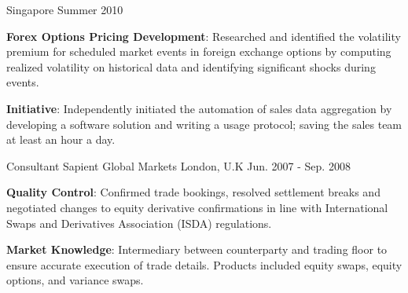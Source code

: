 \begin{cventries}
    {Singapore}
    {Summer 2010}
    {
      \begin{cvitems}
        \item {\textbf{Forex Options Pricing Development}: Researched and identified the volatility premium for scheduled  
        market events in foreign exchange options by computing realized volatility on historical data and   
        identifying significant shocks during events}.
        \item {\textbf{Initiative}: Independently initiated the automation of sales data aggregation by developing a software solution and writing a usage protocol; saving the sales team at least an hour a 
        day}.
      \end{cvitems} 
    }
  \cventry
    {Consultant}
    {Sapient Global Markets}
    {London, U.K}
    {Jun. 2007 - Sep. 2008}
    {
      \begin{cvitems}
        \item {\textbf{Quality Control}: Confirmed trade bookings, resolved settlement breaks and negotiated 
        changes to equity derivative confirmations in line with International Swaps and Derivatives Association 
        (ISDA) regulations}.
        \item {\textbf{Market Knowledge}: Intermediary between counterparty and trading floor to ensure accurate execution of trade details. Products included equity swaps, equity options, and variance swaps}.
      \end{cvitems}
    }
\end{cventries}
